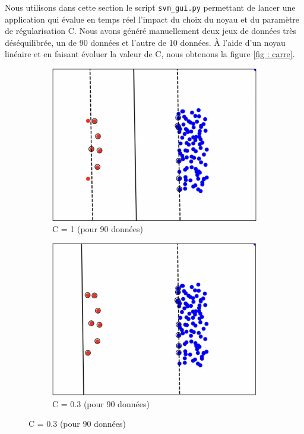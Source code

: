 \documentclass[a4paper,12pt]{article}
\begin{document}
Nous utilisons dans cette section le script \texttt{svm\_gui.py}  permettant de lancer une application qui évalue en temps réel l’impact du choix du noyau et du paramètre de régularisation C.
Nous avons généré manuellement deux jeux de données très déséquilibrée, un de 90 données et l'autre de 10 données. 
À l'aide d'un noyau linéaire et en faisant évoluer la valeur de C, nous obtenons la figure \ref{fig : carre}.


\begin{figure}[H]
    \centering
    \begin{subfigure}[b]{0.45\textwidth}
        \centering
        \includegraphics[width=\textwidth]{Images/C=1.png}
        \caption{C = 1 (pour 90 données)}
    \end{subfigure}
    \hfill
    \begin{subfigure}[b]{0.45\textwidth}
        \centering
        \includegraphics[width=\textwidth]{Images/C=0.3.png}
        \caption{C = 0.3 (pour 90 données)}
    \end{subfigure}


\end{figure}
\end{document}
